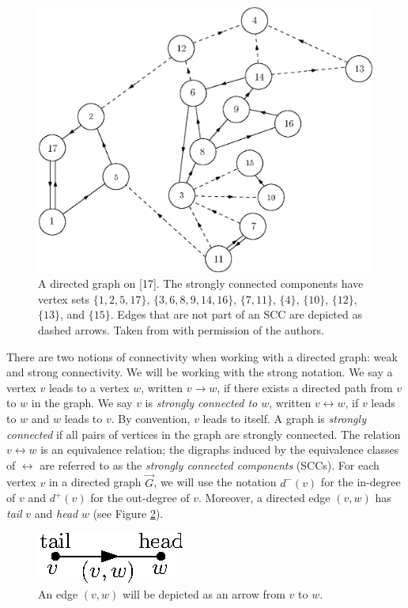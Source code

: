 \begin{figure}
    \centering
    \includegraphics[scale=0.6]{Content/Pictures/Fig1.eps}
    \caption{A directed graph on [17]. The strongly connected components have vertex sets $\{1,2,5,17\}$, $\{3,6,8,9,14,16\}$, $\{7,11\}$, $\{4\}$, $\{10\}$, $\{12\}$, $\{13\}$, and $\{15\}$. Edges that are not part of an SCC are depicted as dashed arrows. Taken from \cite{goldschmidtScalingLimitCritical2021} with permission of the authors.}
    \label{fig.SCCs}
\end{figure}

There are two notions of connectivity when working with a directed graph: weak and strong connectivity. We will be working with the strong notation. We say a vertex $v$ leads to a vertex $w$, written $v \rightarrow w$, if there exists a directed path from $v$ to $w$ in the graph. We say $v$ is \emph{strongly connected to $w$}, written $v \leftrightarrow w$, if $v$ leads to $w$ and $w$ leads to $v$. By convention, $v$ leads to itself. A graph is \emph{strongly connected} if all pairs of vertices in the graph are strongly connected. The relation $v \leftrightarrow w$ is an equivalence relation; the digraphs induced by the equivalence classes of $\leftrightarrow$ are referred to as the \emph{strongly connected components} (SCCs). For each vertex $v$ in a directed graph $\vec{G}$, we will use the notation $d^-(v)$ for the in-degree of $v$ and $d^+(v)$ for the out-degree of $v$. Moreover, a directed edge $(v,w)$ has \emph{tail} $v$ and \emph{head} $w$ (see Figure \ref{fig.tailhead}).
\begin{figure}
    \centering
    \includegraphics{Content/Pictures/Fig2.eps}
    \caption{An edge $(v,w)$ will be depicted as an arrow from $v$ to $w$.}\label{fig.tailhead}
\end{figure}


